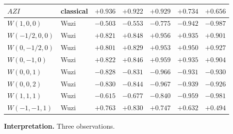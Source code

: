 \documentclass[11pt,a4paper]{article}
\theoremstyle{definition}
\begin{document}
\begin{table}[h]
\begin{tabular}{llrrrrr}
$AZI$              & classical & $\mathbf{+0.936}$ & $\mathbf{+0.922}$ & $+0.929$ & $+0.734$ & $+0.656$\\
\midrule
$W(1, 0, 0)$       & Wuzi      & $-0.503$ & $-0.553$ & $-0.775$ & $-0.942$ & $\mathbf{-0.987}$\\
$W(-1/2, 0, 0)$    & Wuzi      & $+0.821$ & $+0.848$ & $+0.956$ & $+0.935$ & $+0.901$\\
$W(0, -1/2, 0)$    & Wuzi      & $+0.801$ & $+0.829$ & $+0.953$ & $+0.950$ & $+0.927$\\
$W(0, -1, 0)$      & Wuzi      & $+0.822$ & $+0.846$ & $+0.959$ & $+0.935$ & $+0.904$\\
$W(0, 0, 1)$       & Wuzi      & $-0.828$ & $-0.831$ & $-0.966$ & $-0.931$ & $-0.930$\\
$W(0, 0, 2)$       & Wuzi      & $-0.830$ & $-0.844$ & $\mathbf{-0.967}$ & $-0.939$ & $-0.926$\\
$W(1, 1, 1)$       & Wuzi      & $-0.615$ & $-0.677$ & $-0.840$ & $-0.959$ & $-0.981$\\
$W(-1, -1, 1)$     & Wuzi      & $+0.763$ & $+0.830$ & $+0.747$ & $+0.632$ & $+0.494$\\
\bottomrule
\end{tabular}
\end{table}

\textbf{Interpretation.} Three observations.
\end{document}
